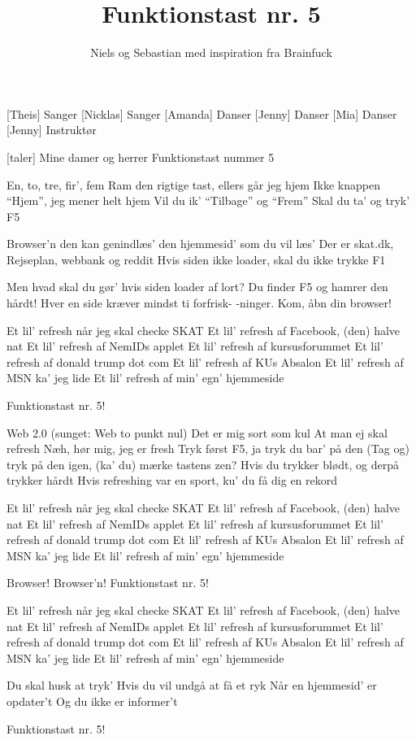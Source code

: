 \documentclass[a4paper,11pt]{article}
\title{Funktionstast nr. 5}
\author{Niels og Sebastian med inspiration fra Brainfuck}
\begin{document}
\maketitle

\begin{roles}
[Theis] Sanger
[Nicklas] Sanger
[Amanda] Danser
[Jenny] Danser
[Mia] Danser
[Jenny] Instruktør
\end{roles}

\begin{song}

[taler]%
Mine damer og herrer
Funktionstast nummer 5

%
En, to, tre, fir', fem
Ram den rigtige tast, ellers går jeg hjem
Ikke knappen "`Hjem"', jeg mener helt hjem
Vil du ik' "`Tilbage"' og "`Frem"'
Skal du ta' og tryk'  F5

Browser'n den kan genindlæs'
den hjemmesid' som du vil læs'
Der er skat.dk, Rejseplan, webbank og reddit
Hvis siden ikke loader, skal du ikke trykke F1

Men hvad skal du gør' hvis siden loader af lort?
Du finder F5 og hamrer den hårdt!
Hver en side kræver mindst ti forfrisk-
-ninger. Kom, åbn din browser!

Et lil' refresh når jeg skal checke SKAT
Et lil' refresh af Facebook, (den) halve nat
Et lil' refresh af NemIDs applet
Et lil' refresh af kursusforummet
Et lil' refresh af donald trump dot com
Et lil' refresh af KUs Absalon
Et lil' refresh af MSN ka' jeg lide
Et lil' refresh af min' egn' hjemmeside

Funktionstast nr. 5!

Web 2.0 (sunget: Web to punkt nul)
Det er mig sort som kul
At man ej skal refresh
Næh, hør mig, jeg er fresh
Tryk først F5, ja tryk du bar' på den
(Tag og) tryk på den igen, (ka' du) mærke tastens zen?
Hvis du trykker blødt, og derpå trykker hårdt
Hvis refreshing var en sport, ku' du få dig en rekord

Et lil' refresh når jeg skal checke SKAT
Et lil' refresh af Facebook, (den) halve nat
Et lil' refresh af NemIDs applet
Et lil' refresh af kursusforummet
Et lil' refresh af donald trump dot com
Et lil' refresh af KUs Absalon
Et lil' refresh af MSN ka' jeg lide
Et lil' refresh af min' egn' hjemmeside

Browser!
Browser'n!
Funktionstast nr. 5!

Et lil' refresh når jeg skal checke SKAT
Et lil' refresh af Facebook, (den) halve nat
Et lil' refresh af NemIDs applet
Et lil' refresh af kursusforummet
Et lil' refresh af donald trump dot com
Et lil' refresh af KUs Absalon
Et lil' refresh af MSN ka' jeg lide
Et lil' refresh af min' egn' hjemmeside

Du skal husk at tryk'
Hvis du vil undgå at få et ryk
Når en hjemmesid' er opdater't
Og du ikke er informer't

Funktionstast nr. 5!

\end{song}
\end{document}
